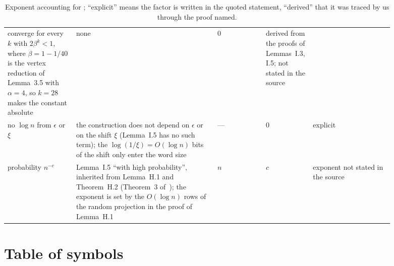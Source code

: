 \documentclass[11pt]{article}
\theoremstyle{remark}
\begin{document}
\begin{table}[H]
\begin{tabular}{@{}p{0.17\linewidth}p{0.35\linewidth}p{0.12\linewidth}%
p{0.05\linewidth}p{0.2\linewidth}@{}}
converge for every $k$ with $2\beta^{k}<1$, where $\beta=1-1/40$ is the
vertex reduction of Lemma~3.5 with $\alpha=4$, so $k=28$ makes the
constant absolute & none & $0$ & derived from the proofs of Lemmas~I.3,
I.5; not stated in the source\\
no $\log n$ from $\epsilon$ or $\xi$ & the construction does not depend on
$\epsilon$ or on the shift $\xi$ (Lemma~I.5 has no such term); the
$\log(1/\xi)=O(\log n)$ bits of the shift only enter the word size & --- &
$0$ & explicit\\
probability $n^{-c}$ & Lemma~I.5 ``with high probability'', inherited from
Lemma~H.1 and Theorem~H.2 (Theorem~3 of~\cite{CLMMPS15:conf}); the
exponent is set by the $O(\log n)$ rows of the random projection in the
proof of Lemma~H.1 & $n$ & $c$ & exponent not stated in the source\\
\bottomrule
\end{tabular}
\caption{Exponent accounting for ; ``explicit'' means the
factor is written in the quoted statement, ``derived'' that it was traced
by us through the proof named.}\label{tab:chain-accounting}
\end{table}

\clearpage
\section{Table of symbols}\label{app:symbols}
\end{document}
